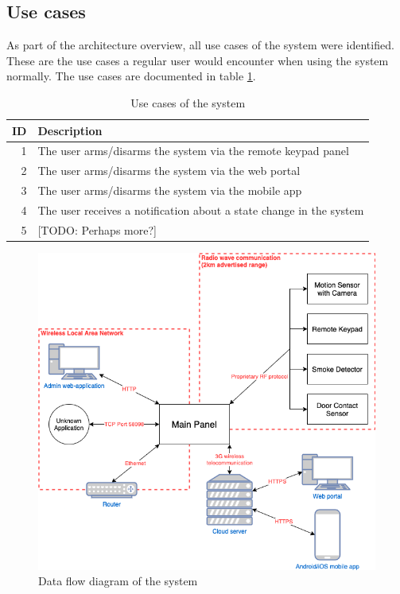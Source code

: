 \subsection{Use cases}
As part of the architecture overview, all use cases of the system were identified. These are the use cases a regular user would encounter when using the system normally. The use cases are documented in table \ref{tb:use-cases}.
\begin{table}[!ht]
    \centering
    \begin{tabularx}{\textwidth}{r X}
        \hline
        \textbf{ID} & \textbf{Description}
        \\ \hline
        1  & The user arms/disarms the system via the remote keypad panel
        \\
        2  & The user arms/disarms the system via the web portal
        \\
        3  & The user arms/disarms the system via the mobile app
        \\
        4  & The user receives a notification about a state change in the system
        \\
        5  & [TODO: Perhaps more?]
        \\ \hline
    \end{tabularx}
    \caption{Use cases of the system}
    \label{tb:use-cases}
\end{table}

\begin{figure}[!ht]
    \centering
    \includegraphics[width=\textwidth]{images/system-overview.png}
    \caption{Data flow diagram of the system}
    \label{fig:system-overview}
\end{figure}

